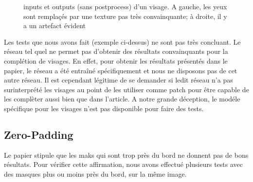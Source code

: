 \documentclass[12pt]{article}
\begin{document}
\begin{figure}[htb]
  \hfill
  \hfill
  \caption{inputs et outputs (sans postprocess) d'un visage. A gauche, les yeux sont remplaçés par une texture pas très convainquante; à droite, il y a un artefact évident}\label{fig:occlus_dynamic}
\end{figure}

Les tests que nous avons fait (exemple ci-dessus) ne sont pas très concluant. Le réseau tel quel ne permet pas d'obtenir des résultats convainquants pour la complétion de visages. En effet, pour obtenir les résultats présentés dans le papier, le réseau a été entraîné spécifiquement et nous ne disposons pas de cet autre réseau. Il est cependant légitime de se demander si ledit réseau n'a pas surinterprété les visages au point de les utiliser comme patch pour être capable de les complèter aussi bien que dans l'article. A notre grande déception, le modéle spécifique pour les visages n'est pas disponible pour faire des tests.

\subsection{Zero-Padding}

Le papier stipule que les maks qui sont trop près du bord ne donnent pas de bons résultats. Pour vérifier cette affirmation, nous avons effectué plusieurs tests avec des masques plus ou moins près du bord, sur la même image.
\end{document}
